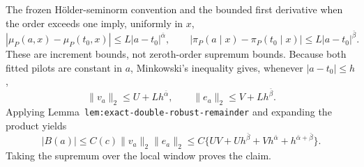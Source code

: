 The frozen H\"older-seminorm convention and the bounded first derivative when the order exceeds one imply, uniformly in \(x\),
\[
|\mu_P(a,x)-\mu_P(t_0,x)|\le L|a-t_0|^{\bar\alpha},
\qquad
|\pi_P(a\mid x)-\pi_P(t_0\mid x)|\le L|a-t_0|^{\bar\beta}.
\]
These are increment bounds, not zeroth-order supremum bounds. Because both fitted pilots are constant in \(a\), Minkowski's inequality gives, whenever \(|a-t_0|\le h\),
\[
\|v_a\|_2\le U+Lh^{\bar\alpha},
\qquad
\|e_a\|_2\le V+Lh^{\bar\beta}.
\]
Applying Lemma~\texttt{lem:exact-double-robust-remainder} and expanding the product yields
\[
|B(a)|\le C(c)\|v_a\|_2\|e_a\|_2
\le C\{UV+Uh^{\bar\beta}+Vh^{\bar\alpha}+h^{\bar\alpha+\bar\beta}\}.
\]
Taking the supremum over the local window proves the claim.
